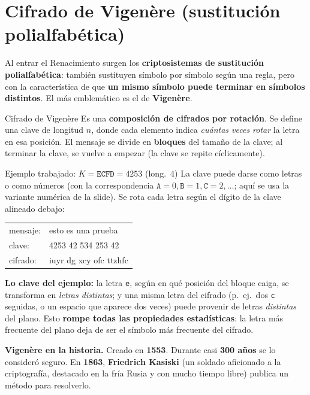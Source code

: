\documentclass[11pt,a4paper]{article}
\begin{document}
\section{Cifrado de Vigenère (sustitución polialfabética)}

Al entrar el Renacimiento surgen los \textbf{criptosistemas de sustitución polialfabética}:
también sustituyen símbolo por símbolo según una regla, pero con la característica de que
\textbf{un mismo símbolo puede terminar en símbolos distintos}. El más emblemático es el de
\textbf{Vigenère}.

\begin{defbox}{Cifrado de Vigenère}
Es una \textbf{composición de cifrados por rotación}. Se define una clave de longitud $n$,
donde cada elemento indica \emph{cuántas veces rotar} la letra en esa posición. El mensaje se
divide en \textbf{bloques} del tamaño de la clave; al terminar la clave, se vuelve a empezar
(la clave se repite cíclicamente).
\end{defbox}

\begin{practbox}{Ejemplo trabajado: $K=\texttt{ECFD}=4253$ (long.\ 4)}
La clave puede darse como letras o como números (con la correspondencia
$\texttt{A}=0,\texttt{B}=1,\texttt{C}=2,\dots$; aquí se usa la variante numérica de la slide).
Se rota cada letra según el dígito de la clave alineado debajo:
\begin{center}\ttfamily\small
\begin{tabular}{ll}
mensaje:  & esto es una prueba\\
clave:    & 4253 42 534 253 42\\
cifrado:  & iuyr dg xcy ofc ttzhfc
\end{tabular}
\end{center}
\textbf{Lo clave del ejemplo:} la letra \texttt{e}, según en qué posición del bloque caiga, se
transforma en \emph{letras distintas}; y una misma letra del cifrado (p.\ ej.\ dos
\texttt{c} seguidas, o un espacio que aparece dos veces) puede provenir de letras \emph{distintas}
del plano. Esto \textbf{rompe todas las propiedades estadísticas}: la letra más frecuente del
plano deja de ser el símbolo más frecuente del cifrado.
\end{practbox}

\begin{notebox}
\textbf{Vigenère en la historia.} Creado en \textbf{1553}. Durante casi \textbf{300 años} se
lo consideró seguro. En \textbf{1863}, \textbf{Friedrich Kasiski} (un soldado aficionado a la
criptografía, destacado en la fría Rusia y con mucho tiempo libre) publica un método para
resolverlo.
\end{notebox}
\end{document}
